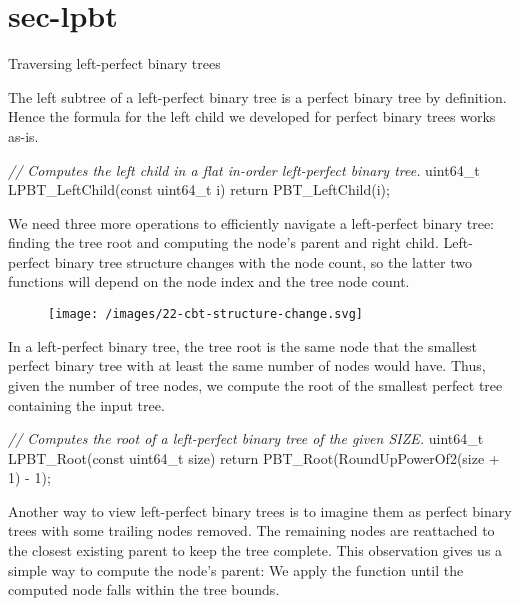 \documentclass{article}
\begin{document}
\section{sec-lpbt}{Traversing left-perfect binary trees}

The left subtree of a left-perfect binary tree is a perfect binary tree by definition.
Hence the formula for the left child we developed for perfect binary trees works as-is.

\begin{code}[c]
\emph{// Computes the left child in a flat in-order left-perfect binary tree.}
uint64_t LPBT_LeftChild(const uint64_t i) { return PBT_LeftChild(i); }
\end{code}

We need three more operations to efficiently navigate a left-perfect binary tree: finding the tree root and computing the node's parent and right child.
Left-perfect binary tree structure changes with the node count, so the latter two functions will depend on the node index and the tree node count.

\begin{figure}[grayscale-diagram]
  \texttt{[image: /images/22-cbt-structure-change.svg]}
\end{figure}

In a left-perfect binary tree, the tree root is the same node that the smallest perfect binary tree with at least the same number of nodes would have.
Thus, given the number of tree nodes, we compute the root of the smallest perfect tree containing the input tree.

\begin{code}[c]
\emph{// Computes the root of a left-perfect binary tree of the given SIZE.}
uint64_t LPBT_Root(const uint64_t size) {
    return PBT_Root(RoundUpPowerOf2(size + 1) - 1);
}
\end{code}

Another way to view left-perfect binary trees is to imagine them as perfect binary trees with some trailing nodes removed.
The remaining nodes are reattached to the closest existing parent to keep the tree complete.
This observation gives us a simple way to compute the node's parent:
We apply the  function until the computed node falls within the tree bounds.
\end{document}
